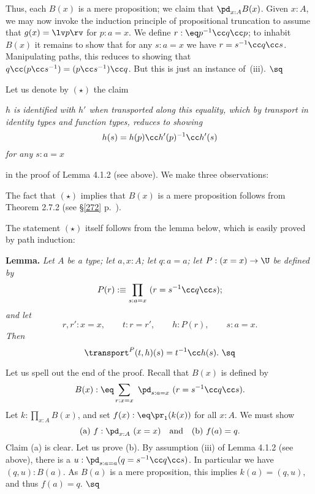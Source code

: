 \documentclass[12pt]{article}
\begin{document}
Thus, each $B(x)$ is a mere proposition; we claim that $\pd_{x:A}B(x)$. Given $x:A$, we may now invoke the induction principle of propositional truncation to assume that $g(x)= \lv p\rv$ for $p:a=x$. We define $r:\eq p^{-1}\cc q\cc p$; to inhabit $B(x)$ it remains to show that for any $s:a=x$ we have $r=s^{-1}\cc q\cc s$. Manipulating paths, this reduces to showing that $q\cc (p\cc s^{-1}) = (p\cc s^{-1}) \cc q$. But this is just an instance of~(iii). $\sq$

Let us denote by $(\star)$ the claim 

\nn\emph{$h$ is identified with $h'$ when transported along this equality, which by transport in identity types and function types, reduces to showing 
$$
h(s)=h(p)\cc h'(p)^{-1}\cc h'(s)
$$ 
for any $s:a=x$}

\nn in the proof of Lemma 4.1.2 (see above). We make three observations:

\nn{} The fact that $(\star)$ implies that $B(x)$ is a mere proposition follows from Theorem 2.7.2 (see \S\ref{272} p.~\pageref{272}). 

\nn{} The statement $(\star)$ itself follows from the lemma below, which is easily proved by path induction:

\nn\textbf{Lemma.} \emph{Let $A$ be a type; let $a,x:A$; let $q:a=a$; let $P:(x=x)\to\U$ be defined by} 
$$
P(r):\equiv\prod_{s:a=x}\ (r=s^{-1}\cc q\cc s);
$$ 
\emph{and let} 
$$
r,r':x=x,\qquad t:r=r',\qquad h:P(r),\qquad s:a=x.
$$ 
\emph{Then} 
$$
\transport^P(t,h)(s)=t^{-1}\cc h(s).\ \sq
$$ 

\nn{} Let us spell out the end of the proof. Recall that $B(x)$ is defined by
$$
B(x):\eq\sum_{r:x=x}\ \pd_{s:a=x}\ (r=s^{-1}\cc q\cc s).
$$ 
Let $k:\prod_{x:A}B(x)$, and set $f(x):\eq\pr_1(k(x))$ for all $x:A$. We must show 
$$
\text{(a) }f:\pd_{x:A}\ (x=x)\quad\text{and}\quad\text{(b) }f(a)=q.
$$ 
Claim (a) is clear. Let us prove (b). By assumption (iii) of Lemma 4.1.2 (see above), there is a $u:\pd_{s:a=a}(q=s^{-1}\cc q\cc s)$. In particular we have $(q,u):B(a)$. As $B(a)$ is a mere proposition, this implies $k(a)=(q,u)$, and thus $f(a)=q$. $\sq$


\end{document}
